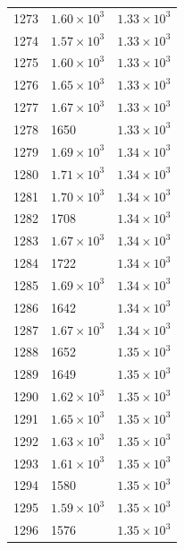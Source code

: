 \begin{table}[H]
\begin{tabular}{lll}
1273 & $\displaystyle 1.60 \times 10^{3}$ & $\displaystyle 1.33 \times 10^{3}$ \\
1274 & $\displaystyle 1.57 \times 10^{3}$ & $\displaystyle 1.33 \times 10^{3}$ \\
1275 & $\displaystyle 1.60 \times 10^{3}$ & $\displaystyle 1.33 \times 10^{3}$ \\
1276 & $\displaystyle 1.65 \times 10^{3}$ & $\displaystyle 1.33 \times 10^{3}$ \\
1277 & $\displaystyle 1.67 \times 10^{3}$ & $\displaystyle 1.33 \times 10^{3}$ \\
1278 & 1650 & $\displaystyle 1.33 \times 10^{3}$ \\
1279 & $\displaystyle 1.69 \times 10^{3}$ & $\displaystyle 1.34 \times 10^{3}$ \\
1280 & $\displaystyle 1.71 \times 10^{3}$ & $\displaystyle 1.34 \times 10^{3}$ \\
1281 & $\displaystyle 1.70 \times 10^{3}$ & $\displaystyle 1.34 \times 10^{3}$ \\
1282 & 1708 & $\displaystyle 1.34 \times 10^{3}$ \\
1283 & $\displaystyle 1.67 \times 10^{3}$ & $\displaystyle 1.34 \times 10^{3}$ \\
1284 & 1722 & $\displaystyle 1.34 \times 10^{3}$ \\
1285 & $\displaystyle 1.69 \times 10^{3}$ & $\displaystyle 1.34 \times 10^{3}$ \\
1286 & 1642 & $\displaystyle 1.34 \times 10^{3}$ \\
1287 & $\displaystyle 1.67 \times 10^{3}$ & $\displaystyle 1.34 \times 10^{3}$ \\
1288 & 1652 & $\displaystyle 1.35 \times 10^{3}$ \\
1289 & 1649 & $\displaystyle 1.35 \times 10^{3}$ \\
1290 & $\displaystyle 1.62 \times 10^{3}$ & $\displaystyle 1.35 \times 10^{3}$ \\
1291 & $\displaystyle 1.65 \times 10^{3}$ & $\displaystyle 1.35 \times 10^{3}$ \\
1292 & $\displaystyle 1.63 \times 10^{3}$ & $\displaystyle 1.35 \times 10^{3}$ \\
1293 & $\displaystyle 1.61 \times 10^{3}$ & $\displaystyle 1.35 \times 10^{3}$ \\
1294 & 1580 & $\displaystyle 1.35 \times 10^{3}$ \\
1295 & $\displaystyle 1.59 \times 10^{3}$ & $\displaystyle 1.35 \times 10^{3}$ \\
1296 & 1576 & $\displaystyle 1.35 \times 10^{3}$ \\

\end{tabular}
\end{table}
